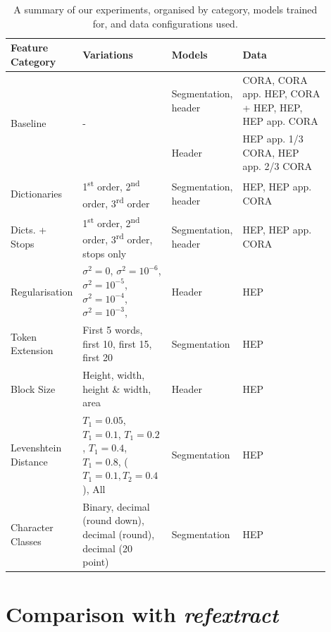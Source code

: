 \begin{table}[h]
\begin{center}
\begin{tabular}{ | p{0.2\linewidth} | p{0.25\linewidth} | p{0.15\linewidth} | p{0.3\linewidth} |}
\hline
Feature Category & Variations & Models & Data\\
\hline
\multirow{2}{*}{Baseline} & \multirow{2}{*}{-} & Segmentation, header & CORA, CORA app. HEP, CORA + HEP, HEP, HEP app. CORA \\
\cline{3-4}
 & & Header & HEP app. 1/3 CORA, HEP app. 2/3 CORA \\
\hline
Dictionaries & 1\textsuperscript{st} order, 2\textsuperscript{nd} order, 3\textsuperscript{rd} order & Segmentation, header & HEP, HEP app. CORA \\
\hline
Dicts. + Stops & 1\textsuperscript{st} order, 2\textsuperscript{nd} order, 3\textsuperscript{rd} order, stops only & Segmentation, header & HEP, HEP app. CORA \\
\hline
Regularisation & $\sigma^2=0$, $\sigma^2 = 10^{-6}$, $\sigma^2 = 10^{-5}$, $\sigma^2 = 10^{-4}$, $\sigma^2 = 10^{-3}$, & Header & HEP \\
\hline
Token Extension & First 5 words, first 10, first 15, first 20 & Segmentation & HEP \\
\hline
Block Size & Height, width, height \& width, area & Header & HEP \\
\hline
Levenshtein Distance & $T_1 = 0.05$, $T_1 = 0.1$, $T_1 = 0.2$, $T_1 = 0.4$, $T_1 = 0.8$, ($T_1 = 0.1, T_2 = 0.4$), All & Segmentation & HEP \\
\hline
Character Classes & Binary, decimal (round down), decimal (round), decimal (20 point) & Segmentation & HEP \\
\hline
\end{tabular}
\caption[A summary of our experiments, organised by category, models trained for, and data configurations used.]{A summary of our experiments, organised by category, models trained for, and data configurations used.}
\label{table:experiments}
\end{center}
\end{table}

\section{Comparison with \emph{refextract}}
\label{sec:refextract}

